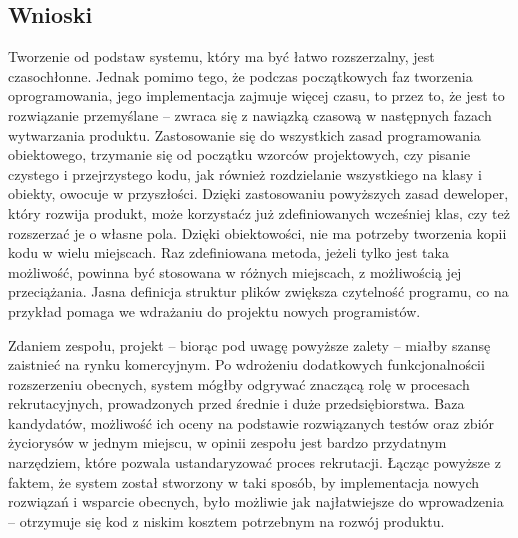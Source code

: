 \documentclass[twoside]{projektInzynierskiMS}
\numberwithin{figure}{section}
\begin{document}
\subsection{Wnioski}
Tworzenie od podstaw systemu, który ma być łatwo rozszerzalny, jest czasochłonne. Jednak pomimo tego, że podczas początkowych faz tworzenia oprogramowania, jego implementacja zajmuje więcej czasu, to przez to, że jest to rozwiązanie przemyślane – zwraca się z nawiązką czasową w następnych fazach wytwarzania produktu. Zastosowanie się do wszystkich zasad programowania obiektowego, trzymanie się od początku wzorców projektowych, czy pisanie czystego i przejrzystego kodu, jak również rozdzielanie wszystkiego na klasy i obiekty, owocuje w przyszłości. Dzięki zastosowaniu powyższych zasad deweloper, który rozwija produkt, może korzystać\linebreak z już zdefiniowanych wcześniej klas, czy też rozszerzać je o własne pola. Dzięki obiektowości, nie ma potrzeby tworzenia kopii kodu w wielu miejscach. Raz zdefiniowana metoda, jeżeli tylko jest taka możliwość, powinna być stosowana w różnych miejscach, z możliwością jej przeciążania. Jasna definicja struktur plików zwiększa czytelność programu, co na przykład pomaga we wdrażaniu do projektu nowych programistów.

Zdaniem zespołu, projekt -- biorąc pod uwagę powyższe zalety -- miałby szansę zaistnieć na rynku komercyjnym. Po wdrożeniu dodatkowych funkcjonalności\linebreak i rozszerzeniu obecnych, system mógłby odgrywać znaczącą rolę w procesach rekrutacyjnych, prowadzonych przed średnie i duże przedsiębiorstwa. Baza kandydatów, możliwość ich oceny na podstawie rozwiązanych testów oraz zbiór życiorysów w jednym miejscu, w opinii zespołu jest bardzo przydatnym narzędziem, które pozwala ustandaryzować proces rekrutacji. Łącząc powyższe z faktem, że system został stworzony w taki sposób, by implementacja nowych rozwiązań i wsparcie obecnych, było możliwie jak najłatwiejsze do wprowadzenia – otrzymuje się kod z niskim kosztem potrzebnym na rozwój produktu.
\end{document}
